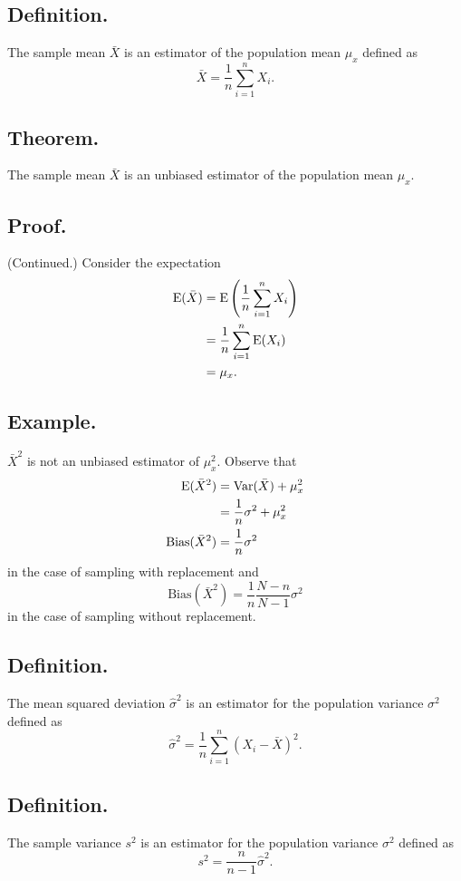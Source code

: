 \documentclass[titlepage]{article}
\begin{document}
\subsection{Definition.} The sample mean $\bar{X}$ is an estimator of the population mean $\mu_{x}$ defined as 
$$\bar{X} = \frac{1}{n}\sum_{i=1}^{n}X_{i}.$$

\subsection{Theorem.} The sample mean $\bar{X}$ is an unbiased estimator of the population mean $\mu_{x}$.

\subsection{Proof.} (Continued.) Consider the expectation
\begin{align*}
    \text{E}(\bar{X}) &= \text{E}\left(\frac{1}{n}\sum_{i=1}^{n}X_{i}\right) \\
                &= \frac{1}{n}\sum_{i=1}^{n}\text{E}(X_{i}) \\
                &= \mu_{x}.
\end{align*}

\subsection{Example.} $\bar{X}^{2}$ is not an unbiased estimator of $\mu_{x}^{2}$. Observe that 
\begin{align*}
             \text{E}(\bar{X}^{2}) &= \text{Var}(\bar{X}) + \mu_{x}^{2} \\
                             &= \frac{1}{n}\sigma^{2} + \mu_{x}^{2} \\
    \text{Bias}(\bar{X}^{2}) &= \frac{1}{n}\sigma^{2}
\end{align*}
in the case of sampling with replacement and 
$$\text{Bias}(\bar{X}^{2}) = \frac{1}{n}\frac{N-n}{N-1}\sigma^{2}$$
in the case of sampling without replacement.

\subsection{Definition.} The mean squared deviation $\hat{\sigma}^{2}$ is an estimator for the population variance $\sigma^{2}$ defined as 
$$\hat{\sigma}^{2} = \frac{1}{n}\sum_{i=1}^{n}(X_{i} - \bar{X})^{2}.$$

\subsection{Definition.} The sample variance $s^{2}$ is an estimator for the population variance $\sigma^{2}$ defined as 
$$s^{2} = \frac{n}{n-1}\hat{\sigma}^{2}.$$
\end{document}
